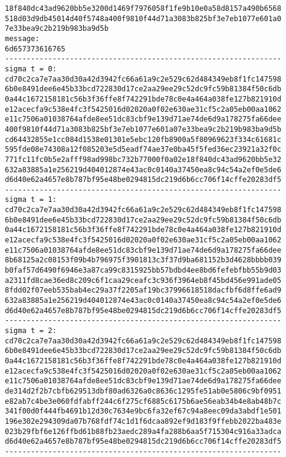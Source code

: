 \documentclass{article}
\begin{document}
{\begin{verbatim}
18f840dc43ad9620bb5e3200d1469f7976058f1fe9b10e0a58d8157a490b6568
518d03d9db45014d40f5748a400f9810f44d71a3083b825bf3e7eb1077e601a0
7e33bea9c2b219b983ba9d5b
message:
6d657373616765
----------------------------------------------------------------
sigma t = 0:
cd70c2ca7e7aa30d30a42d3942fc66a61a9c2e529c62d484349eb8f1fc147598
6b0e8491dee6e45b33bcd722830d17ce2aa29ee29c52dc9fc59b81384f50c6db
0a44c1672158181c56b3f36ffe8f742291bde78c0e4a464a038fe127b821910d
e12acecfa9c538e4fc3f5425016d02020a0f02e630ae31cf5c2a05eb00aa1062
e11c7506a01038764afde8ee51dc83cbf9e139d71ae74de6d9a178275fa66dee
400f9810f44d71a3083b825bf3e7eb1077e601a07e33bea9c2b219b983ba9d5b
cd64432855e1cc084d1538e01301e5ebc120fb8900a5f80969623f334c61681c
595fde08e74308a12f085203e5d5eadf74ae37e0ba45f5fed36ec23921a32f0c
771fc11fc0b5e2afff98ad998bc732b77000f0a02e18f840dc43ad9620bb5e32
632a83885a1e256219d404012874e43ac0c0140a37450ea8c94c54a2ef0e5de6
d6d40e62a4657e8b787bf95e48be0294815dc219d6b6cc706f14cffe20283df5
----------------------------------------------------------------
sigma t = 1:
cd70c2ca7e7aa30d30a42d3942fc66a61a9c2e529c62d484349eb8f1fc147598
6b0e8491dee6e45b33bcd722830d17ce2aa29ee29c52dc9fc59b81384f50c6db
0a44c1672158181c56b3f36ffe8f742291bde78c0e4a464a038fe127b821910d
e12acecfa9c538e4fc3f5425016d02020a0f02e630ae31cf5c2a05eb00aa1062
e11c7506a01038764afde8ee51dc83cbf9e139d71ae74de6d9a178275fa66dee
8b68125a2c08153f09b4b796975f3901813c3f37d9ba681152b3d4628bbbb039
b0faf57d6490f6946e3a87ca99c8315925bb57bdbd4ee8bd6fefebfbb55b9d03
a2311fd8cae36ed8c209c6f1caa29ceafc3c936f3964eb8f45bd456e991ade05
8fdd02f07eeb535bab4ec29a37f2205af19bc37996618518dacfbf6d8ffe6ad9
632a83885a1e256219d404012874e43ac0c0140a37450ea8c94c54a2ef0e5de6
d6d40e62a4657e8b787bf95e48be0294815dc219d6b6cc706f14cffe20283df5
----------------------------------------------------------------
sigma t = 2:
cd70c2ca7e7aa30d30a42d3942fc66a61a9c2e529c62d484349eb8f1fc147598
6b0e8491dee6e45b33bcd722830d17ce2aa29ee29c52dc9fc59b81384f50c6db
0a44c1672158181c56b3f36ffe8f742291bde78c0e4a464a038fe127b821910d
e12acecfa9c538e4fc3f5425016d02020a0f02e630ae31cf5c2a05eb00aa1062
e11c7506a01038764afde8ee51dc83cbf9e139d71ae74de6d9a178275fa66dee
de314d2f2b7cbfb629513dbf80ad6326a0c8636c1295fe51ab0e5806c9bf0951
e82ab7c4be3e060fdfabff244c6f275cf6885c6175b6ae56eab34b4e8ab48b7c
341f00d0f444fb4691b12d30c7634e9bc6fa32ef67c94a8eec09da3abdf1e501
196e302e294309da07b768fdf74c1d1f6dcaa892ef9d183f9ffebb2022ba483e
023b29fbf6e126ffbd61b88fb23aedc289a4fa288b6aa5f715304c916a33adca
d6d40e62a4657e8b787bf95e48be0294815dc219d6b6cc706f14cffe20283df5
----------------------------------------------------------------

\end{verbatim}}
\end{document}
